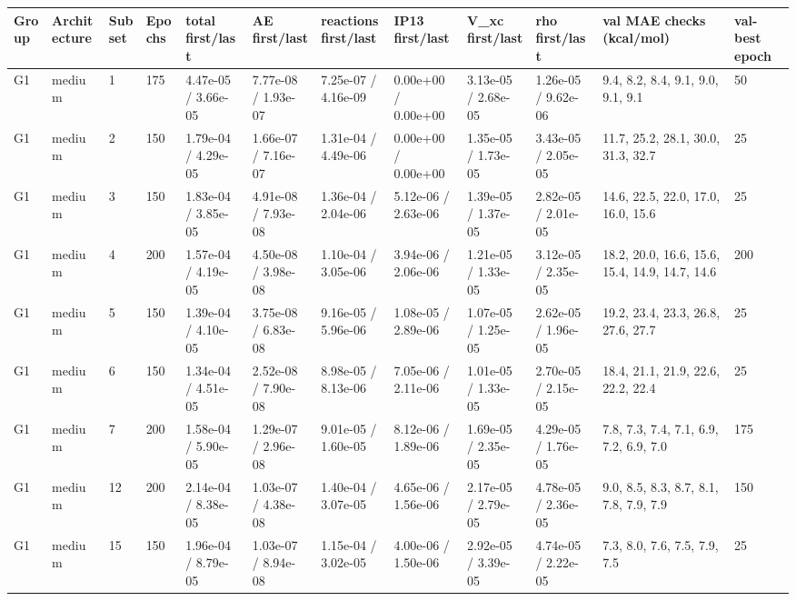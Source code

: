 \documentclass[10pt,a4paper]{article}
\begin{document}
\begin{landscape}
\begin{tiny}
\begin{longtable}{llllllllllll}
\toprule Group & Architecture & Subset & Epochs & total first/last & AE first/last & reactions first/last & IP13 first/last & V\_xc first/last & rho first/last & val MAE checks (kcal/mol) & val-best epoch \\ \midrule \endhead
G1 & medium & 1 & 175 & 4.47e-05 / 3.66e-05 & 7.77e-08 / 1.93e-07 & 7.25e-07 / 4.16e-09 & 0.00e+00 / 0.00e+00 & 3.13e-05 / 2.68e-05 & 1.26e-05 / 9.62e-06 & 9.4, 8.2, 8.4, 9.1, 9.0, 9.1, 9.1 & 50 \\
G1 & medium & 2 & 150 & 1.79e-04 / 4.29e-05 & 1.66e-07 / 7.16e-07 & 1.31e-04 / 4.49e-06 & 0.00e+00 / 0.00e+00 & 1.35e-05 / 1.73e-05 & 3.43e-05 / 2.05e-05 & 11.7, 25.2, 28.1, 30.0, 31.3, 32.7 & 25 \\
G1 & medium & 3 & 150 & 1.83e-04 / 3.85e-05 & 4.91e-08 / 7.93e-08 & 1.36e-04 / 2.04e-06 & 5.12e-06 / 2.63e-06 & 1.39e-05 / 1.37e-05 & 2.82e-05 / 2.01e-05 & 14.6, 22.5, 22.0, 17.0, 16.0, 15.6 & 25 \\
G1 & medium & 4 & 200 & 1.57e-04 / 4.19e-05 & 4.50e-08 / 3.98e-08 & 1.10e-04 / 3.05e-06 & 3.94e-06 / 2.06e-06 & 1.21e-05 / 1.33e-05 & 3.12e-05 / 2.35e-05 & 18.2, 20.0, 16.6, 15.6, 15.4, 14.9, 14.7, 14.6 & 200 \\
G1 & medium & 5 & 150 & 1.39e-04 / 4.10e-05 & 3.75e-08 / 6.83e-08 & 9.16e-05 / 5.96e-06 & 1.08e-05 / 2.89e-06 & 1.07e-05 / 1.25e-05 & 2.62e-05 / 1.96e-05 & 19.2, 23.4, 23.3, 26.8, 27.6, 27.7 & 25 \\
G1 & medium & 6 & 150 & 1.34e-04 / 4.51e-05 & 2.52e-08 / 7.90e-08 & 8.98e-05 / 8.13e-06 & 7.05e-06 / 2.11e-06 & 1.01e-05 / 1.33e-05 & 2.70e-05 / 2.15e-05 & 18.4, 21.1, 21.9, 22.6, 22.2, 22.4 & 25 \\
G1 & medium & 7 & 200 & 1.58e-04 / 5.90e-05 & 1.29e-07 / 2.96e-08 & 9.01e-05 / 1.60e-05 & 8.12e-06 / 1.89e-06 & 1.69e-05 / 2.35e-05 & 4.29e-05 / 1.76e-05 & 7.8, 7.3, 7.4, 7.1, 6.9, 7.2, 6.9, 7.0 & 175 \\
G1 & medium & 12 & 200 & 2.14e-04 / 8.38e-05 & 1.03e-07 / 4.38e-08 & 1.40e-04 / 3.07e-05 & 4.65e-06 / 1.56e-06 & 2.17e-05 / 2.79e-05 & 4.78e-05 / 2.36e-05 & 9.0, 8.5, 8.3, 8.7, 8.1, 7.8, 7.9, 7.9 & 150 \\
G1 & medium & 15 & 150 & 1.96e-04 / 8.79e-05 & 1.03e-07 / 8.94e-08 & 1.15e-04 / 3.02e-05 & 4.00e-06 / 1.50e-06 & 2.92e-05 / 3.39e-05 & 4.74e-05 / 2.22e-05 & 7.3, 8.0, 7.6, 7.5, 7.9, 7.5 & 25 \\

\end{longtable}
\end{tiny}
\end{landscape}
\end{document}
